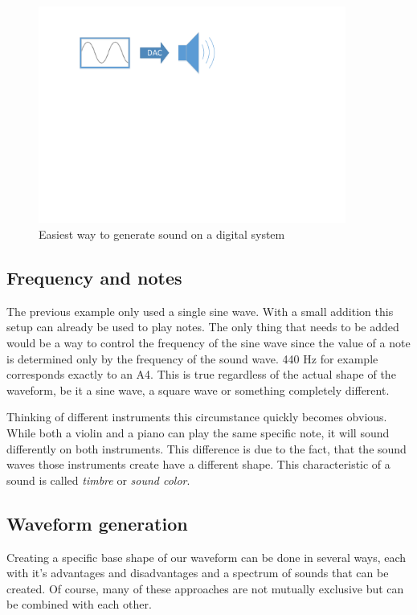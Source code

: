 	  	\begin{figure}[!h]
		\centering
			\includegraphics[width=0.90\textwidth]{images/sound_generation.pdf}
		\caption{Easiest way to generate sound on a digital system }
		\label{fig:sound_generation}
		\end{figure}
		
		\subsection{Frequency and notes}
		The previous example only used a single sine wave. 
		With a small addition this setup can already be used to play notes.
		The only thing that needs to be added would be a way to control the frequency of the sine wave since the value of a note is determined only by the frequency of the sound wave. 
		440 Hz for example corresponds exactly to an A4.
		This is true regardless of the actual shape of the waveform, be it a sine wave, a square wave or something completely different. 

		Thinking of different instruments this circumstance quickly becomes obvious. 
		While both a violin and a piano can play the same specific note, it will sound differently on both instruments.
		This difference is due to the fact, that the sound waves those instruments create have a different shape.
		This characteristic of a sound is called \emph{timbre} or \emph{sound color}.
		
		\subsection{Waveform generation}
		Creating a specific base shape of our waveform can be done in several ways, each with it's advantages and disadvantages and a spectrum of sounds that can be created.
		Of course, many of these approaches are not mutually exclusive but can be combined with each other.
